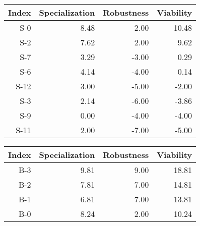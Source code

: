 


\begin{tabular}{ | r | r | r | r | }
    \hline
                 Index  &  Specialization  &      Robustness  &       Viability  \\
    \hline
    \hline
                   S-0  &            8.48  &            2.00  &           10.48  \\
    \hline
                   S-2  &            7.62  &            2.00  &            9.62  \\
    \hline
                   S-7  &            3.29  &           -3.00  &            0.29  \\
    \hline
                   S-6  &            4.14  &           -4.00  &            0.14  \\
    \hline
                  S-12  &            3.00  &           -5.00  &           -2.00  \\
    \hline
                   S-3  &            2.14  &           -6.00  &           -3.86  \\
    \hline
                   S-9  &            0.00  &           -4.00  &           -4.00  \\
    \hline
                  S-11  &            2.00  &           -7.00  &           -5.00  \\
    \hline
\end{tabular}


\begin{tabular}{ | r | r | r | r | }
    \hline
                 Index  &  Specialization  &      Robustness  &       Viability  \\
    \hline
    \hline
                   B-3  &            9.81  &            9.00  &           18.81  \\
    \hline
                   B-2  &            7.81  &            7.00  &           14.81  \\
    \hline
                   B-1  &            6.81  &            7.00  &           13.81  \\
    \hline
                   B-0  &            8.24  &            2.00  &           10.24  \\
    \hline
\end{tabular}


